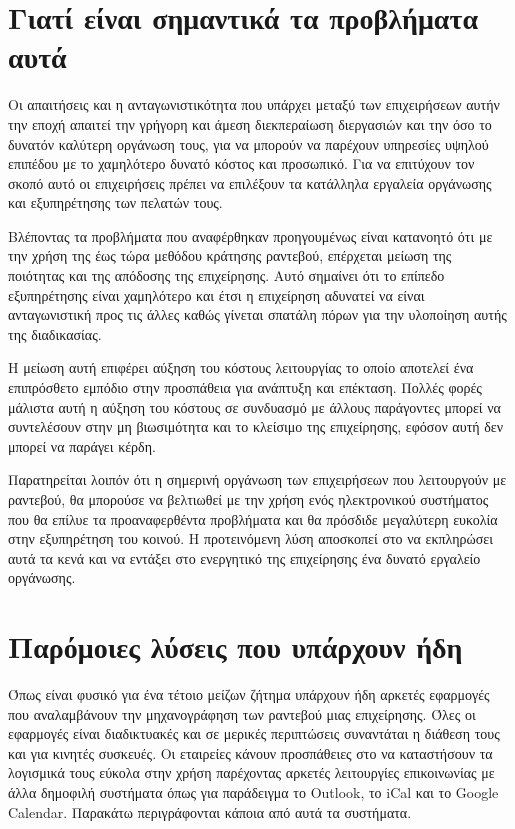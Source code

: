 \section {Γιατί είναι σημαντικά τα προβλήματα αυτά}
Οι απαιτήσεις και η ανταγωνιστικότητα που υπάρχει μεταξύ των επιχειρήσεων αυτήν την εποχή απαιτεί την γρήγορη και άμεση διεκπεραίωση διεργασιών και την όσο το δυνατόν καλύτερη οργάνωση τους, για να μπορούν να παρέχουν υπηρεσίες υψηλού επιπέδου με το χαμηλότερο δυνατό κόστος και προσωπικό. Για να επιτύχουν τον σκοπό αυτό οι επιχειρήσεις πρέπει να επιλέξουν τα κατάλληλα εργαλεία οργάνωσης και εξυπηρέτησης των πελατών τους.

Βλέποντας τα προβλήματα που αναφέρθηκαν προηγουμένως είναι κατανοητό ότι με την χρήση της έως τώρα μεθόδου κράτησης ραντεβού, επέρχεται μείωση της ποιότητας και της απόδοσης της επιχείρησης. Αυτό σημαίνει ότι το επίπεδο εξυπηρέτησης είναι χαμηλότερο και έτσι η επιχείρηση αδυνατεί να είναι ανταγωνιστική προς τις άλλες καθώς γίνεται σπατάλη πόρων για την υλοποίηση αυτής της διαδικασίας.

Η μείωση αυτή επιφέρει αύξηση του κόστους λειτουργίας το οποίο αποτελεί ένα επιπρόσθετο εμπόδιο στην προσπάθεια για ανάπτυξη και επέκταση. Πολλές φορές μάλιστα αυτή η αύξηση του κόστους σε συνδυασμό με άλλους παράγοντες μπορεί να συντελέσουν στην μη βιωσιμότητα και το κλείσιμο της επιχείρησης, εφόσον αυτή δεν μπορεί να παράγει κέρδη.

Παρατηρείται λοιπόν ότι η σημερινή οργάνωση των επιχειρήσεων που λειτουργούν με ραντεβού, θα μπορούσε να βελτιωθεί με την χρήση ενός ηλεκτρονικού συστήματος που θα επίλυε τα προαναφερθέντα προβλήματα και θα πρόσδιδε μεγαλύτερη ευκολία στην εξυπηρέτηση του κοινού. Η προτεινόμενη λύση αποσκοπεί στο να εκπληρώσει αυτά τα κενά και να εντάξει στο ενεργητικό της επιχείρησης ένα δυνατό εργαλείο οργάνωσης.

\section{Παρόμοιες λύσεις που υπάρχουν ήδη}
Όπως είναι φυσικό για ένα τέτοιο μείζων ζήτημα υπάρχουν ήδη αρκετές εφαρμογές που αναλαμβάνουν την μηχανογράφηση των ραντεβού μιας επιχείρησης. Όλες οι εφαρμογές είναι διαδικτυακές και σε μερικές περιπτώσεις συναντάται η διάθεση τους και για κινητές συσκευές. Οι εταιρείες κάνουν προσπάθειες στο να καταστήσουν τα λογισμικά τους εύκολα στην χρήση παρέχοντας αρκετές λειτουργίες επικοινωνίας με άλλα δημοφιλή συστήματα όπως για παράδειγμα το Outlook, το iCal και το Google Calendar. Παρακάτω περιγράφονται κάποια από αυτά τα συστήματα.


